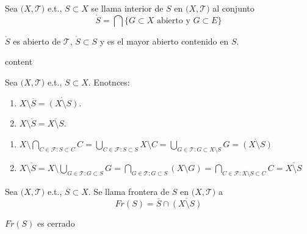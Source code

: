\begin{defn}[Interior]
  Sea $\big( X, \mathcal{T} \big)$ e.t., $S \subset X$ se llama interior de $ S$ en $\big( X, \mathcal{T} \big)$ al conjunto \[  \mathring{S} = \bigcap \{ G \subset X \text{ abierto y } G \subset E \} \] 
\end{defn}

\begin{obs}
  $\mathring{S}$ es abierto de $\mathcal{T}$, $\mathring{S} \subset S$ y es el mayor abierto contenido en $S$.
\end{obs}

\begin{prop}
  content
\end{prop}

\begin{prop}
  Sea $\big( X, \mathcal{T} \big)$ e.t., $ S \subset X$. Enotnces:
  \begin{enumerate}[label=(\roman*)]
    \item $X \setminus \overline{S} = \mathring{(X \setminus S)}$.
    \item $X \setminus \mathring{S} = \overline{X \setminus S}$.
  \end{enumerate}
\end{prop}

\begin{dem}
  \begin{enumerate}[label=(\roman*)]
    \item $X \setminus \bigcap_{C \in \mathcal{F}: S \subset C} C = \bigcup_{C \in \mathcal{F}: S \subset S} X \setminus C = \bigcup_{G \in \mathcal{T}: G \subset X \setminus S} G = \mathring{(X \setminus S)}$
    \item $X \setminus \mathring{S} = X \setminus \bigcup_{G \in \mathcal{T}: G \subset S} G = \bigcap_{G \in \mathcal{T}: G \subset S} (X \setminus G) = \bigcap_{C \in \mathcal{F}: X \setminus S \subset C} C = \overline{X \setminus S}$
  \end{enumerate}
\end{dem}

\begin{defn}[Frontera]
  Sea $\big( X, \mathcal{T} \big)$ e.t., $ S \subset X$. Se llama frontera de $ S$ en $ \big( X, \mathcal{T} \big)$ a \[ Fr(S) = \overline{S} \cap \overline{(X \setminus S)}\]
\end{defn}

\begin{obs}
  $Fr(S)$ es cerrado
\end{obs}

